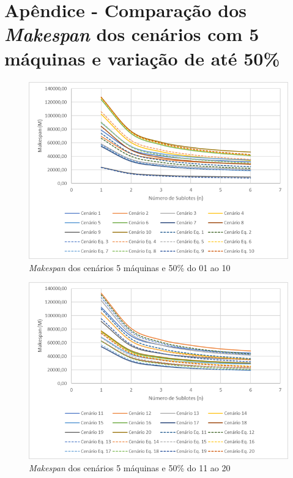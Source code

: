 \newpage
\section{Apêndice - Comparação dos \textit{Makespan} dos cenários com 5 máquinas e variação de até 50\%}\label{app:fig05machine50}

\begin{figure}[H]
    \centering
    \includegraphics[width=13cm]{Apendices/Figuras/05m50_01-10}
    \caption{\textit{Makespan} dos cenários 5 máquinas e 50\% do 01 ao 10}
    \label{fig:05m50_01-10}
\end{figure}

\begin{figure}[H]
    \centering
    \includegraphics[width=13cm]{Apendices/Figuras/05m50_11-20}
    \caption{\textit{Makespan} dos cenários 5 máquinas e 50\% do 11 ao 20}
    \label{fig:05m50_11-20}
\end{figure}

